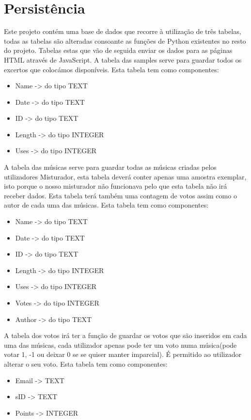 \documentclass{report}
\begin{document}
\section{Persistência}
\label{chap.persistencia}
Este projeto contém uma base de dados que recorre à utilização de três tabelas, todas as tabelas são alteradas consoante as funções de Python existentes no resto do projeto.
Tabelas estas que vão de seguida enviar os dados para as páginas HTML através de JavaScript.
A tabela das samples serve para guardar todos os excertos que colocámos disponíveis.
Esta tabela tem como componentes:
	\begin{itemize}
		\item Name   -> do tipo TEXT
		\item Date   -> do tipo TEXT
		\item ID     -> do tipo TEXT
		\item Length -> do tipo INTEGER
		\item Uses   -> do tipo INTEGER
	\end{itemize}


A tabela das músicas serve para guardar todas as músicas criadas pelos utilizadores Misturador, esta tabela deverá conter apenas uma amostra exemplar, isto porque o nosso misturador não funcionava pelo que esta tabela não irá receber dados.
Esta tabela terá também uma contagem de votos assim como o autor de cada uma das músicas.
Esta tabela tem como componentes:
	\begin{itemize}
		\item Name -> do tipo TEXT
		\item Date -> do tipo TEXT
		\item ID -> do tipo TEXT
		\item Length -> do tipo INTEGER
		\item Uses -> do tipo INTEGER
		\item Votes -> do tipo INTEGER
		\item Author -> do tipo TEXT
	\end{itemize}

A tabela dos votos irá ter a função de guardar os votos que são inseridos em cada uma das músicas, cada utilizador apenas pode ter um voto numa música(pode votar 1, -1 ou deixar 0 se se quiser manter imparcial).
É permitido ao utilizador alterar o seu voto.
Esta tabela tem como componentes:
	\begin{itemize}
		\item Email -> TEXT
		\item sID -> TEXT
		\item Points -> INTEGER
	\end{itemize}
\end{document}
